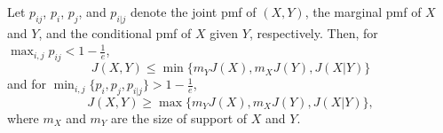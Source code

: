 \documentclass[10pt,a4paper]{amsart}
\begin{document}
\begin{proposition}
    Let $p_{ij}$, $p_i$, $p_j$, and $p_{i|j}$ denote the joint pmf of $(X, Y)$, the marginal pmf of $X$ and $Y$, and the conditional pmf of $X$ given $Y$, respectively. Then, for $\max_{i,j}p_{ij} < 1-\frac{1}{e}$,
    \begin{equation}
        J\left( X, Y \right) \leq \min \{m_YJ(X), m_XJ(Y), J(X|Y) \}
    \end{equation}
    and for $\min_{i,j}\{p_i, p_j, p_{i|j}\}>1-\frac{1}{e}$, 
    \begin{equation}
        J\left( X, Y \right) \geq \max \{m_YJ(X), m_XJ(Y), J(X|Y) \},
    \end{equation}
    where $m_X$ and $m_Y$ are the size of support of $X$ and $Y$.
\end{proposition}
\end{document}
